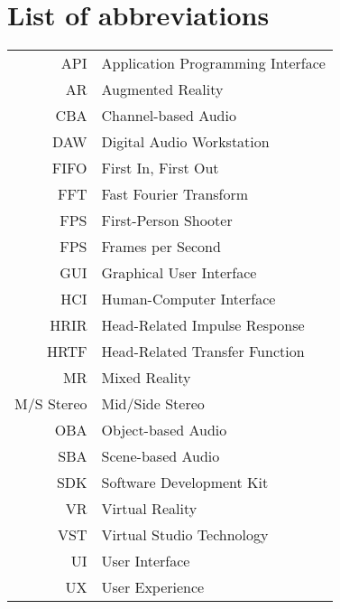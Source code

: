 \documentclass[english,bachelor,unicode]{ctufit-thesis}
\theoremstyle{plain}
\theoremstyle{definition}
\theoremstyle{remark}
\numberwithin{theorem}{chapter}
\begin{document}
\chapter{List of abbreviations}
\begin{tabular}{rl}
API & Application Programming Interface\\
AR & Augmented Reality\\
CBA & Channel-based Audio\\
DAW & Digital Audio Workstation\\
FIFO & First In, First Out\\
FFT & Fast Fourier Transform\\
FPS & First-Person Shooter\\
FPS & Frames per Second\\
GUI & Graphical User Interface\\
HCI & Human-Computer Interface\\
HRIR & Head-Related Impulse Response\\
HRTF & Head-Related Transfer Function\\
MR & Mixed Reality\\
M/S Stereo & Mid/Side Stereo\\
OBA & Object-based Audio\\
SBA & Scene-based Audio\\
SDK & Software Development Kit\\
VR & Virtual Reality\\
VST & Virtual Studio Technology\\
UI & User Interface\\
UX & User Experience\\
\end{tabular}



\mainmatter\mainmatterinit %

\setcounter{page}{1}





\appendix\appendixinit %


\backmatter %

\printbibliography %

\end{document}
